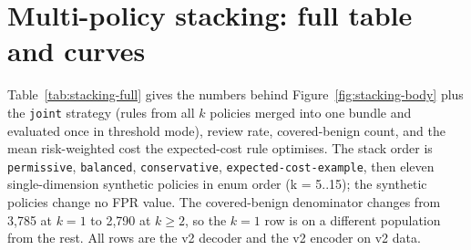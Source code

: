 \section{Multi-policy stacking: full table and curves}
\label{sec:appendix-stacking}

Table~\ref{tab:stacking-full} gives the numbers behind Figure~\ref{fig:stacking-body} plus the
\texttt{joint} strategy (rules from all $k$ policies merged into one bundle
and evaluated once in threshold mode), review rate, covered-benign count,
and the mean risk-weighted cost the expected-cost rule optimises. The stack
order is \texttt{permissive}, \texttt{balanced}, \texttt{conservative},
\texttt{expected-cost-example}, then eleven single-dimension synthetic
policies in enum order (k = 5..15); the synthetic policies change no FPR
value. The covered-benign denominator changes from 3,785 at $k{=}1$ to 2,790
at $k{\ge}2$, so the $k{=}1$ row is on a different population from the rest.
All rows are the v2 decoder and the v2 encoder on v2 data.

